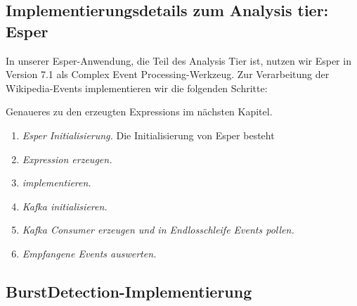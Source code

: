 \subsection{Implementierungsdetails zum Analysis tier: Esper}
In unserer Esper-Anwendung, die Teil des Analysis Tier ist, nutzen wir Esper in Version 7.1 als Complex Event Processing-Werkzeug. Zur Verarbeitung
der Wikipedia-Events implementieren wir die folgenden Schritte:

Genaueres zu den erzeugten Expressions im nächsten Kapitel.

\begin{enumerate}
    \item \textit{Esper Initialisierung.} Die Initialisierung von Esper besteht
    \item \textit{Expression erzeugen.}
    \item \textit{ implementieren.}
    \item \textit{Kafka initialisieren.}
    \item \textit{Kafka Consumer erzeugen und in Endlosschleife Events pollen.}
    \item \textit{Empfangene Events auswerten.}
\end{enumerate}


\subsection{BurstDetection-Implementierung}